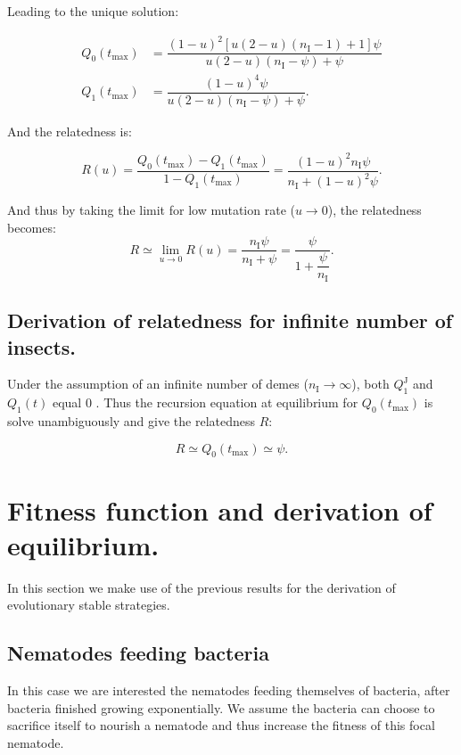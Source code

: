 \documentclass{article}
\newcommand{\nI}{{n_\textrm{I}}}
\begin{document}
 Leading to the unique solution:
 
 \begin{align}
 Q_0(t_{\mathrm{max}}) &= \dfrac{ (1-u)^2 [u (2 - u)(\nI-1) +1 ]\psi }{ u (2-u )(\nI - \psi )+\psi }\\
 Q_1(t_{\mathrm{max}}) &= \dfrac{(1- u )^4 \psi}{u (2-u) (\nI - \psi ) +\psi}.
 \end{align}

 And the relatedness is: 
 
 \begin{equation}
 R(u)=\dfrac{Q_0(t_{\mathrm{max}})-Q_1(t_{\mathrm{max}})}{1-Q_1(t_{\mathrm{max}})}=\dfrac{(1-u)^2 \nI \psi}{\nI +(1-u)^2 \psi}.
 \end{equation}
 
And thus by taking the limit for low mutation rate ($u \rightarrow 0$), the relatedness becomes:
 \begin{equation}
 R \simeq \lim_{u \to 0} R(u)=\dfrac{\nI \psi}{\nI + \psi}=\dfrac{\psi}{1+ \dfrac{\psi}{\nI}}. \label{R=psi(nI)}
 \end{equation}
 
\subsection{Derivation of relatedness for infinite number of insects.}
Under the assumption of an infinite number of demes ($\nI \rightarrow \infty$), both $Q_1^{\mathrm{J}}$ and $Q_1(t)$ equal $0$ \cite{rousset2004genetic}. Thus the recursion equation at equilibrium for $Q_0(t_{\mathrm{max}})$ is solve unambiguously and give the relatedness $R$:

\begin{equation}
R \simeq Q_0(t_{\mathrm{max}}) \simeq \psi. \label{R=psi}
\end{equation}

\section{Fitness function and derivation of equilibrium.}
 \label{section_fitness}
 In this section we make use of the previous results for the derivation of evolutionary stable strategies.
 \subsection{Nematodes feeding bacteria}
 In this case we are interested the nematodes feeding themselves of bacteria, after bacteria finished growing exponentially. We assume the bacteria can choose to sacrifice itself to nourish a nematode and thus increase the fitness of this focal nematode.
 
\end{document}
